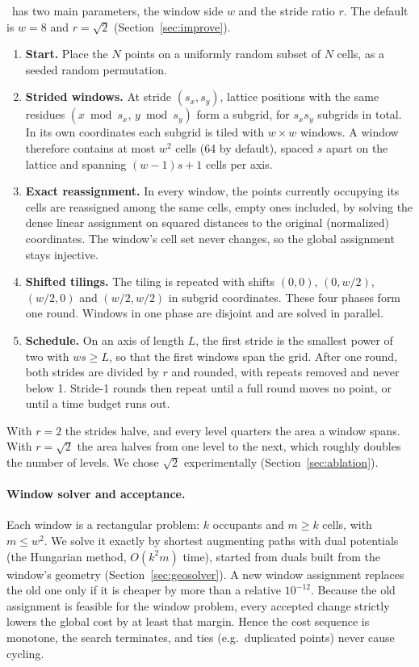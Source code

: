 \ShuffleSnap\ has two main parameters, the window side $w$ and the stride ratio $r$. The
default is $w=8$ and $r=\sqrt2$ (Section~\ref{sec:improve}).
\begin{enumerate}
\item \textbf{Start.} Place the $N$ points on a uniformly random subset of $N$ cells, as a
  seeded random permutation.
\item \textbf{Strided windows.} At stride $(s_x,s_y)$, lattice positions with the same
  residues $(x \bmod s_x,\, y\bmod s_y)$ form a subgrid, for $s_x s_y$ subgrids in
  total. In its own coordinates each subgrid is tiled with $w\times w$ windows. A window
  therefore contains at most $w^2$ cells (64 by default), spaced $s$ apart on the lattice
  and spanning $(w-1)s+1$ cells per axis.
\item \textbf{Exact reassignment.} In every window, the points currently occupying its
  cells are reassigned among the same cells, empty ones included, by solving the dense
  linear assignment on squared distances to the original (normalized) coordinates. The
  window's cell set never changes, so the global assignment stays injective.
\item \textbf{Shifted tilings.} The tiling is repeated with shifts $(0,0)$, $(0,w/2)$,
  $(w/2,0)$ and $(w/2,w/2)$ in subgrid coordinates. These four phases form one round.
  Windows in one phase are disjoint and are solved in parallel.
\item \textbf{Schedule.} On an axis of length $L$, the first stride is the smallest power of
  two with $ws\ge L$, so that the first windows span the grid. After one round, both strides
  are divided by $r$ and rounded, with repeats removed and never below 1. Stride-1 rounds
  then repeat until a full round moves no point, or until a time budget runs out.
\end{enumerate}
With $r=2$ the strides halve, and every level quarters the area a window spans. With
$r=\sqrt2$ the area halves from one level to the next, which roughly doubles the number of
levels. We chose $\sqrt2$ experimentally (Section~\ref{sec:ablation}).

\paragraph{Window solver and acceptance.} Each window is a rectangular problem: $k$
occupants and $m\ge k$ cells, with $m\le w^2$. We solve it exactly by
shortest augmenting paths with dual potentials (the Hungarian method, $O(k^2m)$ time),
started from duals built from the window's geometry (Section~\ref{sec:geosolver}). A new window assignment replaces the old
one only if it is cheaper by more than a relative $10^{-12}$. Because the old assignment
is feasible for the window problem, every accepted change strictly lowers the global
cost by at least that margin. Hence the cost sequence is monotone, the search
terminates, and ties (e.g.\ duplicated points) never cause cycling.

